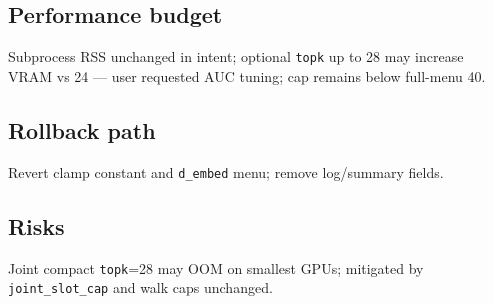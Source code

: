 \documentclass{article}
\begin{document}
\subsection*{Performance budget}
Subprocess RSS unchanged in intent; optional \texttt{topk} up to 28 may increase
VRAM vs 24 --- user requested AUC tuning; cap remains below full-menu 40.

\subsection*{Rollback path}
Revert clamp constant and \texttt{d\_embed} menu; remove log/summary fields.

\subsection*{Risks}
Joint compact \texttt{topk}=28 may OOM on smallest GPUs; mitigated by
\texttt{joint\_slot\_cap} and walk caps unchanged.
\end{document}
